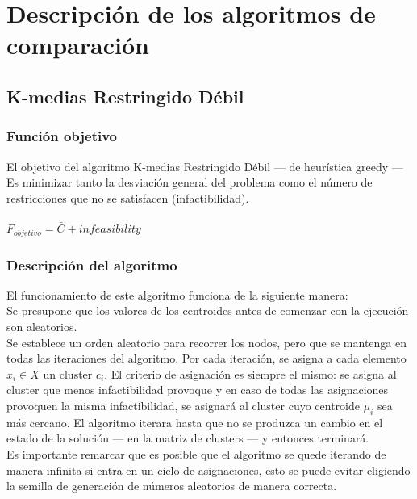 \chapter{Descripción de los algoritmos de comparación}
\section{K-medias Restringido Débil}
\subsection{Función objetivo}
El objetivo del algoritmo K-medias Restringido Débil --- de heurística greedy --- Es minimizar tanto la desviación general del problema como el número de restricciones que no se satisfacen (infactibilidad). \\
\\
$ F_{objetivo} = \bar{C} + infeasibility $

\subsection{Descripción del algoritmo}
El funcionamiento de este algoritmo funciona de la siguiente manera:\\
Se presupone que los valores de los centroides antes de comenzar con la ejecución son aleatorios.\\
Se establece un orden aleatorio para recorrer los nodos, pero que se mantenga en todas las iteraciones del algoritmo. Por cada iteración, se asigna a cada elemento $ x_{i} \in X $ un cluster $ c_{i} $. El criterio de asignación es siempre el mismo: se asigna al cluster que menos infactibilidad provoque y en caso de todas las asignaciones provoquen la misma infactibilidad, se asignará al cluster cuyo centroide  $ \mu_{i} $ sea más cercano.
El algoritmo iterara hasta que no se produzca un cambio en el estado de la solución --- en la matriz de clusters --- y entonces terminará.\\
Es importante remarcar que es posible que el algoritmo se quede iterando de manera infinita si entra en un ciclo de asignaciones, esto se puede evitar eligiendo la semilla de generación de números aleatorios de manera correcta.

